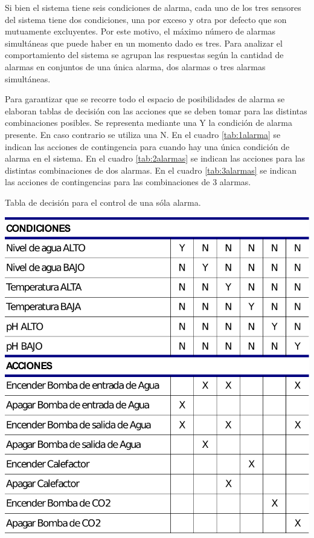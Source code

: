Si bien el sistema tiene seis condiciones de alarma, cada uno de los tres sensores del sistema tiene dos condiciones, una por exceso y otra por defecto que son mutuamente excluyentes.  Por este motivo, el máximo número de alarmas simultáneas que puede haber en un momento dado es tres. Para analizar el comportamiento del sistema se agrupan las respuestas según la cantidad de alarmas en conjuntos de una única alarma, dos alarmas o tres alarmas simultáneas.

Para garantizar que se recorre todo el espacio de posibilidades de alarma se elaboran tablas de decisión con las acciones que se deben tomar para las distintas combinaciones posibles.  Se representa mediante una Y la condición de alarma presente.  En caso contrario se utiliza una N. En el cuadro \ref{tab:1alarma} se indican las acciones de contingencia para cuando hay una única condición de alarma en el sistema.  En el cuadro \ref{tab:2alarmas} se indican las acciones para las distintas combinaciones de dos alarmas. En el cuadro \ref{tab:3alarmas} se indican las acciones de contingencias para las combinaciones de 3 alarmas.

\begin{table}[h]
	\centering
	\caption{Tabla de decisión para el control de una sóla alarma.}
    \includegraphics[height=.4\textheight]{./Figures/tabla1alarma.pdf}
	\label{tab:1alarma}
\end{table}

